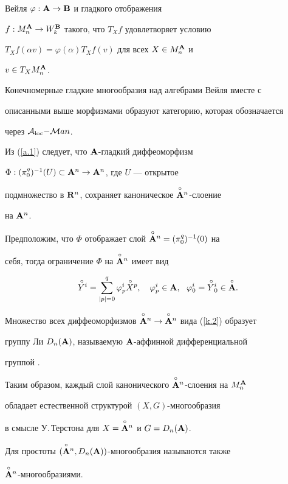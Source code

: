 Вейля $\varphi:{\bold A}\to{\bold B}$ и гладкого отображения


$f:M^{\bold A}_n\to W^{\bold B}_k$ такого, что $T_Xf$ удовлетворяет условию


$T_Xf(\alpha v)=\varphi(\alpha)T_Xf(v)$ для всех $X\in M^{\bold A}_n$ и


$v\in T_XM^{\bold A}_n$.


Конечномерные гладкие многообразия над алгебрами Вейля вместе с


описанными выше морфизмами образуют категорию, которая обозначается


через ${\cal A}_{\operatorname{loc}}{-}{\cal M}an$.


 


Из (\ref{a.1}) следует, что ${\bold A}$-гладкий диффеоморфизм


$\Phi:({\pi^q_0})^{-1}(U)\subset{\bold A}^n\to{\bold A}^n$, где $U$ --- открытое


подмножество в ${\bold R}^n$, сохраняет каноническое $\overset{\circ}{{\bold A}}{}^n$-слоение


на ${\bold A}^n$.


Предположим, что $\Phi$ отображает слой $\overset{\circ}{{\bold A}}{}^n=({\pi^q_0})^{-1}(0)$ на


себя, тогда ограничение $\Phi$ на $\overset{\circ}{{\bold A}}{}^n$ имеет вид


\begin{equation}


{\puto Y}{}^i=


\sum^q_{|p|=0}\varphi^i_p{\puto X}{}^p,


\quad \varphi^i_p\in\A,\ \


\varphi^i_0={\puto Y}{}^i_0\in\Ao.


\label{k.2}


\end{equation}


Множество всех диффеоморфизмов $\overset{\circ}{{\bold A}}{}^n\to\overset{\circ}{{\bold A}}{}^n$ вида (\ref{k.2}) образует


группу Ли $D_n({\bold A})$, называемую ${\bold A}$-аффинной дифференциальной


группой \cite{VSh1}.


Таким образом, каждый слой канонического $\overset{\circ}{{\bold A}}{}^n$-слоения на $M_n^{\bold A}$


обладает естественной структурой $(X,G)$-многообразия


в смысле У.\,Терстона \cite{Thur} для $X=\overset{\circ}{{\bold A}}{}^n$ и $G=D_n({\bold A})$.


Для простоты $(\overset{\circ}{{\bold A}}{}^n,D_n({\bold A}))$-многообразия называются также


$\overset{\circ}{{\bold A}}{}^n$-многообразиями.


